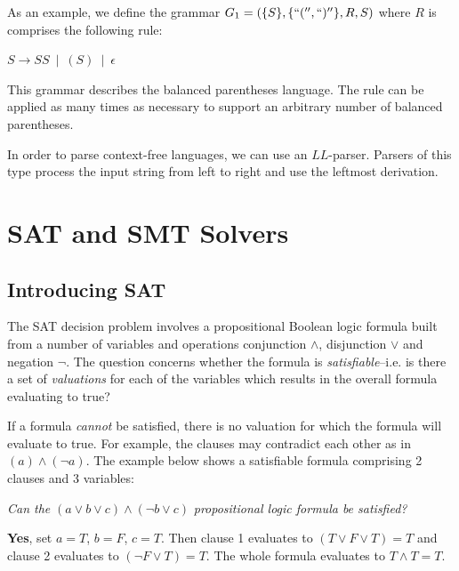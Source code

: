 \documentclass[a4paper,openany,12pt]{book}
\begin{document}
As an example, we define the grammar $G_1 = (\{S\}, \{``('', ``)''\}, R, S)$ where $R$ is comprises the following rule:

\(
    S \to SS ~ \mid ~ (S) ~ \mid ~ \epsilon
\)

This grammar describes the balanced parentheses language.
The rule can be applied as many times as necessary to support an arbitrary number of balanced parentheses.


In order to parse context-free languages, we can use an $LL$-parser.
Parsers of this type process the input string from left to right and use the leftmost derivation.


\section{SAT and SMT Solvers}

\subsection{Introducing SAT}

The SAT decision problem involves a propositional Boolean logic formula built from a number of variables and operations
conjunction $\land$, disjunction $\lor$ and negation $\neg$.
The question concerns whether the formula is \emph{satisfiable}--i.e. is there a set of \emph{valuations} for each of
the variables which results in the overall formula evaluating to true?

If a formula \emph{cannot} be satisfied, there is no valuation for which the formula will evaluate to true.
For example, the clauses may contradict each other as in $(a) \land (\neg a)$.
The example below shows a satisfiable formula comprising 2 clauses and 3 variables:

\emph{Can the} \(
    (a \lor b \lor c) \land (\neg b \lor c)
\) \emph{propositional logic formula be satisfied?}

\textcolor{id7-emerald-green}{\textbf{Yes}}, set $a = T$, $b=F$, $c=T$.
Then clause 1 evaluates to $(T \lor F \lor T) = T$ and clause 2 evaluates to $(\neg F \lor T) = T$.
The whole formula evaluates to $T \land T = T$.\\
\end{document}

